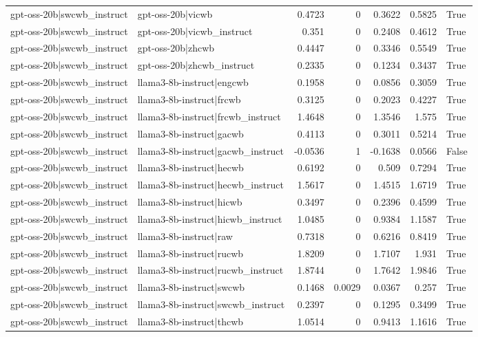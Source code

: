 \begin{table}
\begin{tabular}{l l r r r r l}
gpt-oss-20b|swcwb_instruct & gpt-oss-20b|vicwb & 0.4723 & 0 & 0.3622 & 0.5825 & True \\
gpt-oss-20b|swcwb_instruct & gpt-oss-20b|vicwb_instruct & 0.351 & 0 & 0.2408 & 0.4612 & True \\
gpt-oss-20b|swcwb_instruct & gpt-oss-20b|zhcwb & 0.4447 & 0 & 0.3346 & 0.5549 & True \\
gpt-oss-20b|swcwb_instruct & gpt-oss-20b|zhcwb_instruct & 0.2335 & 0 & 0.1234 & 0.3437 & True \\
gpt-oss-20b|swcwb_instruct & llama3-8b-instruct|engcwb & 0.1958 & 0 & 0.0856 & 0.3059 & True \\
gpt-oss-20b|swcwb_instruct & llama3-8b-instruct|frcwb & 0.3125 & 0 & 0.2023 & 0.4227 & True \\
gpt-oss-20b|swcwb_instruct & llama3-8b-instruct|frcwb_instruct & 1.4648 & 0 & 1.3546 & 1.575 & True \\
gpt-oss-20b|swcwb_instruct & llama3-8b-instruct|gacwb & 0.4113 & 0 & 0.3011 & 0.5214 & True \\
gpt-oss-20b|swcwb_instruct & llama3-8b-instruct|gacwb_instruct & -0.0536 & 1 & -0.1638 & 0.0566 & False \\
gpt-oss-20b|swcwb_instruct & llama3-8b-instruct|hecwb & 0.6192 & 0 & 0.509 & 0.7294 & True \\
gpt-oss-20b|swcwb_instruct & llama3-8b-instruct|hecwb_instruct & 1.5617 & 0 & 1.4515 & 1.6719 & True \\
gpt-oss-20b|swcwb_instruct & llama3-8b-instruct|hicwb & 0.3497 & 0 & 0.2396 & 0.4599 & True \\
gpt-oss-20b|swcwb_instruct & llama3-8b-instruct|hicwb_instruct & 1.0485 & 0 & 0.9384 & 1.1587 & True \\
gpt-oss-20b|swcwb_instruct & llama3-8b-instruct|raw & 0.7318 & 0 & 0.6216 & 0.8419 & True \\
gpt-oss-20b|swcwb_instruct & llama3-8b-instruct|rucwb & 1.8209 & 0 & 1.7107 & 1.931 & True \\
gpt-oss-20b|swcwb_instruct & llama3-8b-instruct|rucwb_instruct & 1.8744 & 0 & 1.7642 & 1.9846 & True \\
gpt-oss-20b|swcwb_instruct & llama3-8b-instruct|swcwb & 0.1468 & 0.0029 & 0.0367 & 0.257 & True \\
gpt-oss-20b|swcwb_instruct & llama3-8b-instruct|swcwb_instruct & 0.2397 & 0 & 0.1295 & 0.3499 & True \\
gpt-oss-20b|swcwb_instruct & llama3-8b-instruct|thcwb & 1.0514 & 0 & 0.9413 & 1.1616 & True \\

\end{tabular}
\end{table}
